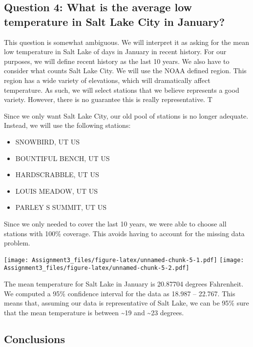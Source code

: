\documentclass[
]{article}
\providecommand{\tightlist}{%
  \setlength{\itemsep}{0pt}\setlength{\parskip}{0pt}}
\begin{document}
\hypertarget{question-4-what-is-the-average-low-temperature-in-salt-lake-city-in-january}{%
\subsection{Question 4: What is the average low temperature in Salt Lake
City in
January?}\label{question-4-what-is-the-average-low-temperature-in-salt-lake-city-in-january}}

This question is somewhat ambiguous. We will interpret it as asking for
the mean low temperature in Salt Lake of days in January in recent
history. For our purposes, we will define recent history as the last 10
years. We also have to consider what counts Salt Lake City. We will use
the NOAA defined region. This region has a wide variety of elevations,
which will dramatically affect temperature. As such, we will select
stations that we believe represents a good variety. However, there is no
guarantee this is really representative. T

Since we only want Salt Lake City, our old pool of stations is no longer
adequate. Instead, we will use the following stations:

\begin{itemize}
\tightlist
\item
  SNOWBIRD, UT US
\item
  BOUNTIFUL BENCH, UT US
\item
  HARDSCRABBLE, UT US
\item
  LOUIS MEADOW, UT US
\item
  PARLEY S SUMMIT, UT US
\end{itemize}

Since we only needed to cover the last 10 years, we were able to choose
all stations with 100\% coverage. This avoids having to account for the
missing data problem.

\texttt{[image: Assignment3\_files/figure-latex/unnamed-chunk-5-1.pdf]}
\texttt{[image: Assignment3\_files/figure-latex/unnamed-chunk-5-2.pdf]}

The mean temperature for Salt Lake in January is 20.87704 degrees
Fahrenheit. We computed a 95\% confidence interval for the data as
18.987 -- 22.767. This means that, assuming our data is representative
of Salt Lake, we can be 95\% sure that the mean temperature is between
\textasciitilde19 and \textasciitilde23 degrees.

\hypertarget{conclusions}{%
\subsection{Conclusions}\label{conclusions}}
\end{document}
